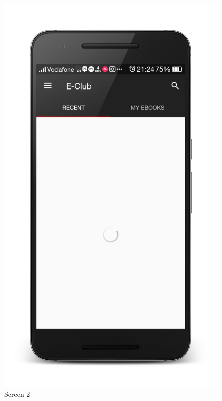 \begin{figure}[ht]
\centering
\includegraphics[scale=0.13]{images/d15.png}
\caption{Screen 2}
\end{figure}

\newpage

